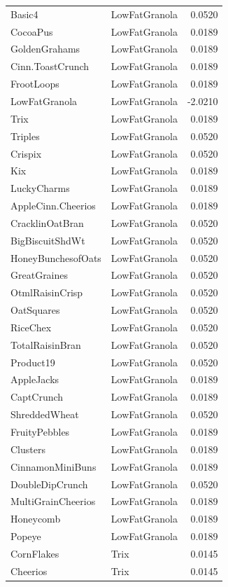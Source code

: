 \begin{longtable}{llr}
Basic4 & LowFatGranola & 0.0520 \\
CocoaPus & LowFatGranola & 0.0189 \\
GoldenGrahams & LowFatGranola & 0.0189 \\
Cinn.ToastCrunch & LowFatGranola & 0.0189 \\
FrootLoops & LowFatGranola & 0.0189 \\
LowFatGranola & LowFatGranola & -2.0210 \\
Trix & LowFatGranola & 0.0189 \\
Triples & LowFatGranola & 0.0520 \\
Crispix & LowFatGranola & 0.0520 \\
Kix & LowFatGranola & 0.0189 \\
LuckyCharms & LowFatGranola & 0.0189 \\
AppleCinn.Cheerios & LowFatGranola & 0.0189 \\
CracklinOatBran & LowFatGranola & 0.0520 \\
BigBiscuitShdWt & LowFatGranola & 0.0520 \\
HoneyBunchesofOats & LowFatGranola & 0.0520 \\
GreatGraines & LowFatGranola & 0.0520 \\
OtmlRaisinCrisp & LowFatGranola & 0.0520 \\
OatSquares & LowFatGranola & 0.0520 \\
RiceChex & LowFatGranola & 0.0520 \\
TotalRaisinBran & LowFatGranola & 0.0520 \\
Product19 & LowFatGranola & 0.0520 \\
AppleJacks & LowFatGranola & 0.0189 \\
CaptCrunch & LowFatGranola & 0.0189 \\
ShreddedWheat & LowFatGranola & 0.0520 \\
FruityPebbles & LowFatGranola & 0.0189 \\
Clusters & LowFatGranola & 0.0189 \\
CinnamonMiniBuns & LowFatGranola & 0.0189 \\
DoubleDipCrunch & LowFatGranola & 0.0520 \\
MultiGrainCheerios & LowFatGranola & 0.0189 \\
Honeycomb & LowFatGranola & 0.0189 \\
Popeye & LowFatGranola & 0.0189 \\
CornFlakes & Trix & 0.0145 \\
Cheerios & Trix & 0.0145 \\

\end{longtable}
